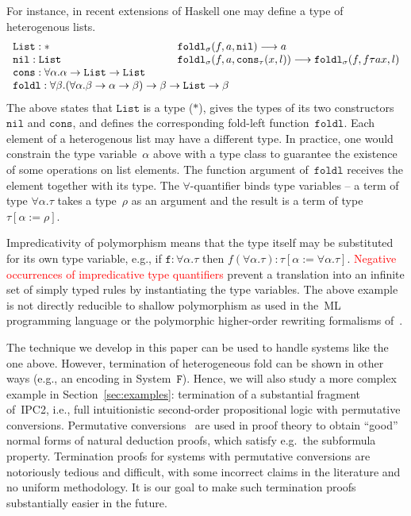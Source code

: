 \documentclass[a4paper,UKenglish,cleveref,autoref,numberwithinsect]{lipics-v2019}
\theoremstyle{definition}
\newcommand{\arrtype}{\rightarrow}
\newcommand{\subst}[2]{#1:=#2}
\newcommand{\red}{\longrightarrow}
\newcommand{\List}{\mathtt{List}}
\newcommand{\nil}{\mathtt{nil}}
\newcommand{\cons}{\mathtt{cons}}
\newcommand{\LCchange}[1]{\textcolor{red}{#1}}
\begin{document}
For instance, in recent extensions of Haskell one may define a type of
heterogenous lists.
\[
\begin{array}{ll}
  \List : * &
  \mathtt{foldl}_\sigma(f,a,\nil) \red a \\
  \mathtt{nil} : \List &
  \mathtt{foldl}_\sigma(f,a,\cons_\tau(x,l)) \red \mathtt{foldl}_\sigma(f,f \tau a x,l) \\
  \mathtt{cons} : \forall \alpha . \alpha \arrtype \List \arrtype \List \quad\quad \\
  \multicolumn{2}{l}{\mathtt{foldl} : \forall \beta . (\forall \alpha . \beta \arrtype \alpha \arrtype \beta) \arrtype \beta \arrtype \List \arrtype \beta}
\end{array}
\]
The above states that $\List$ is a type ($*$), gives the types of its
two constructors $\nil$ and $\cons$, and defines the corresponding
fold-left function~$\mathtt{foldl}$. Each element of a heterogenous
list may have a different type. In practice, one would
  constrain the type variable~$\alpha$ above with a type class to
  guarantee the existence of some operations on list elements.  The
function argument of~$\mathtt{foldl}$ receives the element together
with its type. The $\forall$-quantifier binds type variables -- a term
of type $\forall \alpha . \tau$ takes a type~$\rho$ as an argument and
the result is a term of type~$\tau[\subst{\alpha}{\rho}]$.

Impredicativity of polymorphism means that the type itself may be
substituted for its own type variable, e.g., if $\mathtt{f} : \forall
\alpha . \tau$ then $f (\forall \alpha . \tau) :
\tau[\subst{\alpha}{\forall\alpha.\tau}]$. \LCchange{Negative occurrences of
impredicative type quantifiers} prevent a translation
into an infinite set of simply typed rules by instantiating the type
variables. The above example is not directly reducible to shallow
polymorphism as used in the~ML programming language or the polymorphic
higher-order rewriting formalisms of~\cite{jou:oka:91,jou:rub:99}.

The technique we develop in this paper can be used to handle
systems like the one above. However, termination of heterogeneous
fold can be shown in other ways (e.g., an encoding in
System~$\mathtt{F}$). Hence, we will also study a more complex example
in Section~\ref{sec:examples}: termination of a substantial fragment
of~IPC2, i.e., full intuitionistic second-order propositional logic
with permutative conversions. Permutative
conversions~\cite[Chapter~6]{TroelstraSchwichtenberg1996} are used in
proof theory to obtain ``good'' normal forms of natural deduction
proofs, which satisfy e.g.~the subformula property. Termination proofs
for systems with permutative conversions are notoriously tedious and
difficult, with some incorrect claims in the literature and no uniform
methodology. It is our goal to make such termination proofs
substantially easier in the future.
\end{document}
